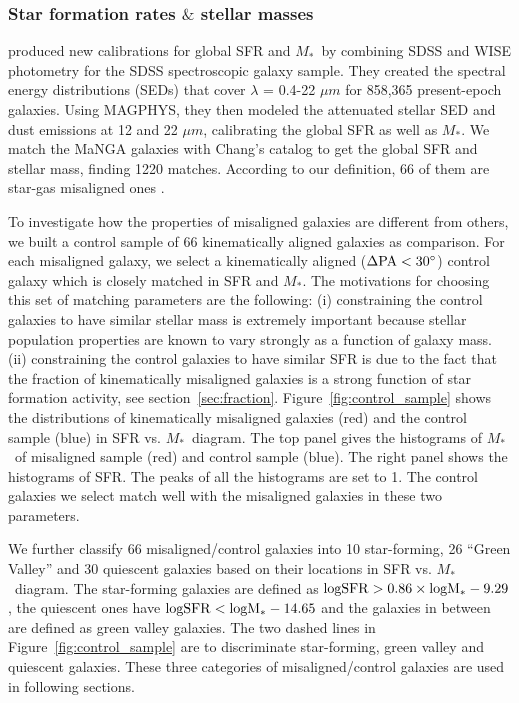 \documentclass[a4paper,fleqn,usenatbib]{mnras}
\newcommand{\mstar}{$M_*$}
\begin{document}
\subsubsection{Star formation rates $\&$ stellar masses}\label{sec:sfrsm}

\cite{chang-2015} produced new calibrations for global SFR and \mstar\ by combining SDSS and WISE photometry for the SDSS spectroscopic galaxy sample. They created the spectral energy distributions (SEDs) that cover $\lambda$ = 0.4-22 $\mu m$ for 858,365 present-epoch galaxies. Using MAGPHYS, they then modeled the attenuated stellar SED and dust emissions at 12 and 22 $\mu m$, calibrating the global SFR as well as \mstar.
We match the MaNGA galaxies with Chang's catalog to get the global SFR and stellar mass, finding 1220 matches. 
According to our definition, 66 of them are star-gas misaligned ones \citep{chen-prep}. %

To investigate how the properties of misaligned galaxies are different from others, we built a control sample of 66 kinematically aligned galaxies as comparison.
For each misaligned galaxy, we select a kinematically aligned (${\rm \Delta PA}<30^\circ$) control galaxy which is closely matched in SFR and \mstar. The motivations for choosing this set of matching parameters are the following: 
(i) constraining the control galaxies to have similar stellar mass is extremely important because stellar population properties are known to vary strongly as a function of galaxy mass. 
(ii) constraining the control galaxies to have similar SFR is due to the fact that the fraction of kinematically misaligned galaxies is a strong function of star formation activity, see section~\ref{sec:fraction}.
Figure~\ref{fig:control_sample} shows the distributions of kinematically misaligned galaxies (red) and the control sample (blue) in SFR vs. \mstar\ diagram. 
The top panel gives the histograms of \mstar\ of misaligned sample (red) and control sample (blue). The right panel shows the histograms of SFR. The peaks of all the histograms are set to 1. The control galaxies we select match well with the misaligned galaxies in these two parameters.

We further classify 66 misaligned/control galaxies into 10 star-forming, 26 ``Green Valley'' and 30 quiescent galaxies based on their locations in SFR vs. \mstar\ diagram.
The star-forming galaxies are defined as $\rm{log SFR > 0.86 \times log M_* - 9.29}$, 
the quiescent ones have $\rm{log SFR < log M_* -14.65}$ and the galaxies in between are defined as green valley galaxies.
The two dashed lines in Figure~\ref{fig:control_sample} are to discriminate star-forming, green valley and quiescent galaxies.
These three categories of misaligned/control galaxies are used in following sections.
\end{document}
